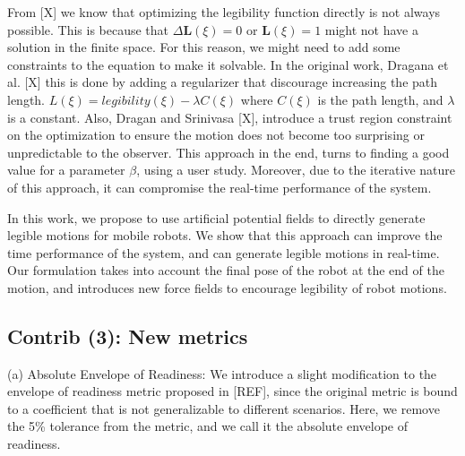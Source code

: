\documentclass[11pt]{article}
\begin{document}
    From [X] we know that optimizing the legibility function directly is not always possible.
    This is because that $\Delta \mathbf{L}(\xi) = 0$ or $\mathbf{L}(\xi) = 1$ might not have a solution in the finite space.
    For this reason, we might need to add some constraints to the equation to make it solvable.
    In the original work, Dragana et al. [X] this is done by adding a regularizer that discourage increasing the path length.
    $L(\xi) = legibility(\xi) - \lambda C(\xi)$
    where $C(\xi)$ is the path length, and $\lambda$ is a constant.
    Also, Dragan and Srinivasa [X], introduce a trust region constraint on the optimization
     to ensure the motion does not become too surprising or unpredictable to the observer.
    This approach in the end, turns to finding a good value for a parameter $\beta$, using a user study.
    Moreover, due to the iterative nature of this approach, it can compromise the real-time performance of the system.

    In this work, we propose to use artificial potential fields to directly generate legible motions for mobile robots.
    We show that this approach can improve the time performance of the system, and can generate legible motions in real-time.
    Our formulation takes into account the final pose of the robot at the end of the motion,
    and introduces new force fields to encourage legibility of robot motions.



    \noindent
    \subsection{Contrib (3): New metrics}

    \noindent
    (a) Absolute Envelope of Readiness:
    We introduce a slight modification to the {envelope of readiness} metric proposed in [REF],
    since the original metric is bound to a coefficient that is not generalizable to different scenarios.
    Here, we remove the 5\% tolerance from the metric, and we call it the absolute envelope of readiness.
\end{document}
